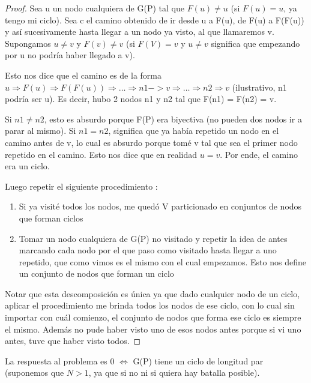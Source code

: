 \begin{proof}
	Sea u un nodo cualquiera de G(P) tal que $F(u) \neq u$ (si $F(u) = u$, ya tengo mi ciclo). Sea c el camino obtenido de ir desde u a F(u), de F(u) a F(F(u)) y así sucesivamente hasta llegar a un nodo ya visto, al que llamaremos v. Supongamos $u \ne v$ y $F(v) \neq v$ (si $F(V) = v$ y $u \ne v$ significa que empezando por u no podría haber llegado a v).  \newline

	Esto nos dice que el camino es de la forma $u \Rightarrow F(u) \Rightarrow F(F(u)) \Rightarrow \ldots \Rightarrow n1 -> v \Rightarrow \ldots \Rightarrow n2 \Rightarrow v$ (ilustrativo, n1 podría ser u). Es decir, hubo 2 nodos n1 y n2 tal que F(n1) = F(n2) = v.   \newline

	Si $n1 \ne n2$, esto es absurdo porque F(P) era biyectiva (no pueden dos nodos ir a parar al mismo). Si $n1 = n2$, significa que ya había repetido un nodo en el camino antes de v, lo cual es absurdo porque tomé v tal que sea el primer nodo repetido en el camino. Esto nos dice que en realidad $u = v$. Por ende, el camino era un ciclo.  \newline

	Luego repetir el siguiente procedimiento :  \newline

	\begin{enumerate}
		\item{Si ya visité todos los nodos, me quedó V particionado en conjuntos de nodos que forman ciclos}
		\item{Tomar un nodo cualquiera de G(P) no visitado y repetir la idea de antes marcando cada nodo por el que paso como visitado hasta llegar a uno repetido, que como vimos es el mismo con el cual empezamos. Esto nos define un conjunto de nodos que forman un ciclo}
	\end{enumerate}	

	Notar que esta descomposición es única ya que dado cualquier nodo de un ciclo, aplicar el procedimiento me brinda todos los nodos de ese ciclo, con lo cual sin importar con cuál comienzo, el conjunto de nodos que forma ese ciclo es siempre el mismo. Además no pude haber visto uno de esos nodos antes porque si vi uno antes, tuve que haber visto todos.

\end{proof}

\begin{theorem}[La Magia]
	La respuesta al problema es 0 $\iff$ G(P) tiene un ciclo de longitud par (suponemos que $N > 1$, ya que si no ni si quiera hay batalla posible).
\end{theorem}

